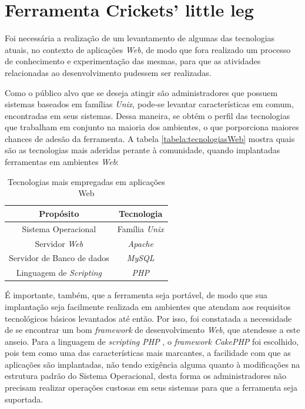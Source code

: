 \chapter{Ferramenta Crickets' little leg}\label{2_ferramenta_cll}

Foi necessária a realização de um levantamento de algumas das tecnologias atuais, no contexto de aplicações \textit{Web}, de modo que fora realizado um processo de conhecimento e experimentação das mesmas, para que as atividades relacionadas ao desenvolvimento pudessem ser realizadas.

Como o público alvo que se deseja atingir são administradores que possuem sistemas baseados em famílias \textit{Unix}, pode-se levantar características em comum, encontradas em seus sistemas. Dessa maneira, se obtém o perfil das tecnologias que trabalham em conjunto na maioria dos ambientes, o que porporciona maiores chances de adesão da ferramenta. A tabela \ref{tabela:tecnologiasWeb} mostra quais são as tecnologias mais aderidas perante à comunidade, quando implantadas ferramentas em ambientes \textit{Web}:

\begin{table}[ht]
    \centering
    \caption{\label{tabela:tecnologiasWeb}Tecnologias mais empregadas em aplicações Web}

    \begin{tabular}{c c}
        \hline
        \hline

        Propósito & Tecnologia\\ [0.5ex]
        \hline

        Sistema Operacional & Família \textit{Unix}\\

        Servidor \textit{Web} & \textit{Apache}\\

        Servidor de Banco de dados & \textit{MySQL}\\

        Linguagem de \textit{Scripting} & \textit{PHP}\\ [0.1ex]
        \hline
    \end{tabular}
    \label{webapptech}
\end{table}

É importante, também, que a ferramenta seja portável, de modo que sua implantação seja facilmente realizada em ambientes que atendam aos requisitos tecnológicos básicos levantados até então. Por isso, foi constatada a necessidade de se encontrar um bom \textit{framework} de desenvolvimento \textit{Web}, que atendesse a este anseio. Para a linguagem de \textit{scripting PHP} \cite{PHP}, o \textit{framework CakePHP} \cite{CakePHP} foi escolhido, pois tem como uma das características mais marcantes, a facilidade com que as aplicações são implantadas, não tendo exigência alguma quanto à modificações na estrutura padrão do Sistema Operacional, desta forma os administradores não precisam realizar operações custosas em seus sistemas para que a ferramenta seja suportada.


